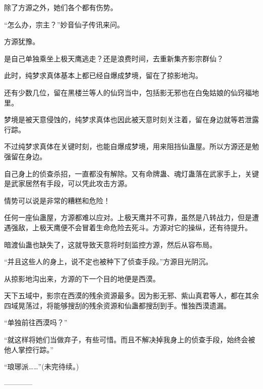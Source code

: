 \begin{this_body}
除了方源之外，她们各个都有伤势。

“怎么办，宗主？”妙音仙子传讯来问。

方源犹豫。

是自己单独乘坐上极天鹰逃走？还是浪费时间，去重新集齐影宗群仙？

此时，纯梦求真体基本上都已经自爆成梦境，留在了掠影地沟。

还有少数几位，留在黑楼兰等人的仙窍当中，包括影无邪也在白兔姑娘的仙窍福地里。

梦境是被天意侵蚀的，纯梦求真体也因此被天意时刻关注着，留在身边就等若泄露行踪。

不过纯梦求真体在关键时刻，也能自爆成梦境，用来阻挡仙蛊屋。所以方源还是勉强留在身边。

自己身上的侦查杀招，一直都没有解除。又有命牌蛊、魂灯蛊落在武家手上，关键是武家居然有手段，可以凭此攻击方源。

情势可以说是非常的糟糕和危险！

任何一座仙蛊屋，方源都难以应对。上极天鹰并不可靠，虽然是八转战力，但是遭遇强敌，上极天鹰便不会冒着生命危险去死斗。方源对它的操纵，还有待提升。

暗渡仙蛊也缺失了，这就导致天意将时刻监控方源，然后从容布局。

“并且这些人的身上，说不定也被种下了侦查手段。”方源目光阴沉。

从掠影地沟出来，方源的下一个目的地便是西漠。

天下五域中，影宗在西漠的残余资源最多。因为影无邪、紫山真君等人，都在其余四域晃荡过，将能够搜刮的残余资源和仙蛊都搜刮到手。惟独西漠遗漏。

“单独前往西漠吗？”

“就这样将她们当做弃子，有些可惜。而且不解决掉我身上的侦查手段，始终会被他人掌控行踪。”

“琅琊派……”(未完待续。)

------------

\end{this_body}

